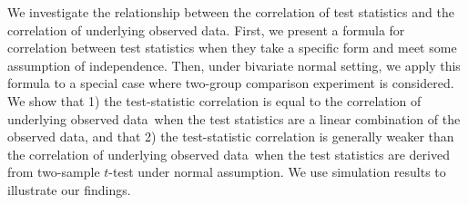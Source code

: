 \documentclass[12pt, a4paper]{article}
\newcommand{\popucor}{the correlation of underlying observed data}
\begin{document}









We investigate the relationship between the correlation of test
statistics and \popucor.  First, we present a formula for correlation between
test statistics when they take a specific form and meet some assumption of
independence. Then, under bivariate normal setting, we apply this formula to a
special case where two-group comparison experiment is considered. We show that
1) the test-statistic correlation is equal to \popucor~when the test
statistics are a linear combination of the observed data, and that 2) the test-statistic 
correlation is generally weaker  
than \popucor~when the test statistics are derived from two-sample $t$-test under normal
assumption. We use simulation results to illustrate our findings.


\end{document}
